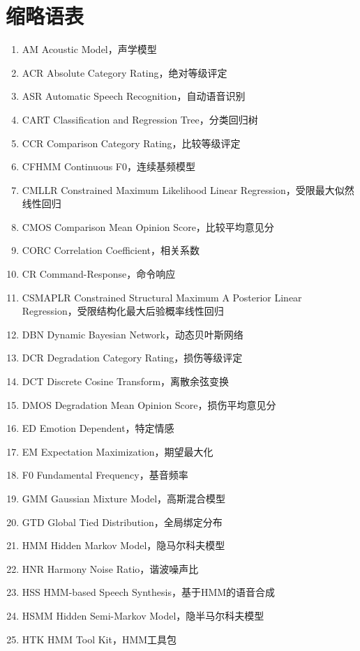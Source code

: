 \section{缩略语表}
\begin{enumerate}
    \item AM Acoustic Model，声学模型
    \item ACR Absolute Category Rating，绝对等级评定
    \item ASR Automatic Speech Recognition，自动语音识别
    \item CART Classification and Regression Tree，分类回归树
    \item CCR Comparison Category Rating，比较等级评定
    \item CFHMM Continuous F0，连续基频模型
    \item CMLLR Constrained Maximum Likelihood Linear Regression，受限最大似然线性回归
    \item CMOS Comparison Mean Opinion Score，比较平均意见分
    \item CORC Correlation Coefficient，相关系数
    \item CR Command-Response，命令响应
    \item CSMAPLR Constrained Structural Maximum A Posterior Linear Regression，受限结构化最大后验概率线性回归
    \item DBN Dynamic Bayesian Network，动态贝叶斯网络
    \item DCR Degradation Category Rating，损伤等级评定
    \item DCT Discrete Cosine Transform，离散余弦变换
    \item DMOS Degradation Mean Opinion Score，损伤平均意见分
    \item ED Emotion Dependent，特定情感
    \item EM Expectation Maximization，期望最大化
    \item F0 Fundamental Frequency，基音频率
    \item GMM Gaussian Mixture Model，高斯混合模型
    \item GTD Global Tied Distribution，全局绑定分布
    \item HMM Hidden Markov Model，隐马尔科夫模型
    \item HNR Harmony Noise Ratio，谐波噪声比
    \item HSS HMM-based Speech Synthesis，基于HMM的语音合成
    \item HSMM Hidden Semi-Markov Model，隐半马尔科夫模型
    \item HTK HMM Tool Kit，HMM工具包

\end{enumerate}
